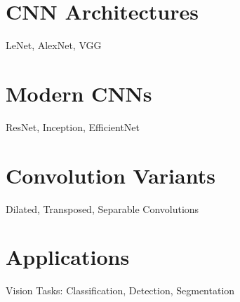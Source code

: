 \documentclass[aspectratio=169]{beamer}
\begin{document}
\section{CNN Architectures}
\begin{frame}{LeNet, AlexNet, VGG}
\end{frame}

\section{Modern CNNs}
\begin{frame}{ResNet, Inception, EfficientNet}
\end{frame}

\section{Convolution Variants}
\begin{frame}{Dilated, Transposed, Separable Convolutions}
\end{frame}

\section{Applications}
\begin{frame}{Vision Tasks: Classification, Detection, Segmentation}
\end{frame}
\end{document}
